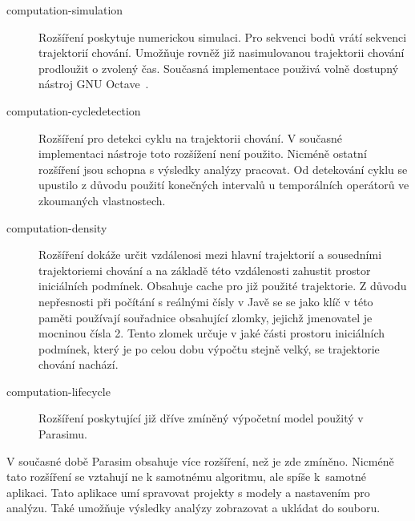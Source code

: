 \begin{description}

	\item[computation-simulation] 		Rozšíření poskytuje numerickou simulaci. Pro se\-kven\-ci bodů vrátí
										sekvenci trajektorií chování. Umožňuje rovněž již nasimulovanou trajektorii
										chování prodloužit o zvolený čas. Současná implementace použivá volně dostupný
										nástroj GNU Octave~\cite{eaton2008}. 

    \item[computation-cycledetection]	Rozšíření pro detekci cyklu na trajektorii cho\-vá\-ní. V současné
										implementaci nástroje toto rozšížení není použito. Nicméně ostatní
										rozšíření jsou schopna s výsledky analýzy pracovat. Od detekování
										cyklu se upustilo z důvodu použití konečných intervalů u
										temporálních operátorů ve zkoumaných vlastnostech.

    \item[computation-density]			Rozšíření dokáže určit vzdálenosi mezi hlavní trajektorií a sousedními trajektoriemi chování a na
										základě této vzdá\-le\-nos\-ti zahustit prostor iniciálních podmínek. Obsahuje cache pro
										již použité trajektorie. Z důvodu nepřesnosti při počítání s reálnými čísly v Javě se
										se jako klíč v této paměti používají souřadnice obsahující zlomky, jejichž jmenovatel
										je mocninou čísla 2. Tento zlomek určuje v jaké části prostoru iniciálních podmínek,
										který je po celou dobu výpočtu stejně velký, se trajektorie chování nachází.

	\item[computation-lifecycle]		Rozšíření poskytující již dříve zmíněný výpočetní model použitý v Parasimu. 

\end{description}

V současné době Parasim obsahuje více rozšíření, než je zde zmíněno. Nicméně tato rozšíření se vztahují ne k samotnému
algoritmu, ale spíše k~samotné aplikaci. Tato aplikace umí spravovat projekty s modely a nastavením
pro analýzu. Také umožňuje výsledky analýzy zobrazovat a ukládat do souboru.
